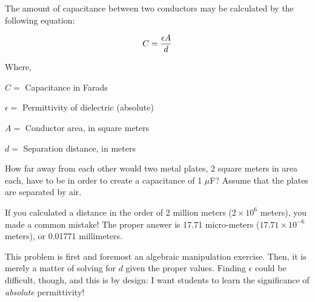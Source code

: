 

The amount of capacitance between two conductors may be calculated by the following equation:

$$C = {\epsilon A \over d}$$

\noindent
Where,

$C =$ Capacitance in Farads

$\epsilon =$ Permittivity of dielectric (absolute)

$A =$ Conductor area, in square meters

$d =$ Separation distance, in meters

\vskip 10pt

How far away from each other would two metal plates, 2 square meters in area each, have to be in order to create a capacitance of 1 $\mu$F?  Assume that the plates are separated by air.







If you calculated a distance in the order of 2 million meters ($2 \times 10^6$ meters), you made a common mistake!  The proper answer is 17.71 micro-meters ($17.71 \times 10^{-6}$ meters), or 0.01771 millimeters.







This problem is first and foremost an algebraic manipulation exercise.  Then, it is merely a matter of solving for $d$ given the proper values.  Finding $\epsilon$ could be difficult, though, and this is by design: I want students to learn the significance of {\it absolute} permittivity!




